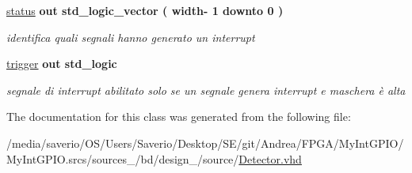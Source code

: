 \begin{DoxyCompactItemize}
\mbox{\label{classDetector_a17089959c3a7d7eef447970d57b5fece}} 
\hyperlink{classDetector_a17089959c3a7d7eef447970d57b5fece}{status}  {\bfseries {\bfseries \textcolor{vhdlchar}{out}\textcolor{vhdlchar}{ }}} {\bfseries \textcolor{vhdlchar}{std\+\_\+logic\+\_\+vector}\textcolor{vhdlchar}{ }\textcolor{vhdlchar}{(}\textcolor{vhdlchar}{ }\textcolor{vhdlchar}{ }\textcolor{vhdlchar}{width}\textcolor{vhdlchar}{-\/}\textcolor{vhdlchar}{ } \textcolor{vhdldigit}{1} \textcolor{vhdlchar}{ }\textcolor{vhdlchar}{downto}\textcolor{vhdlchar}{ } \textcolor{vhdldigit}{0} \textcolor{vhdlchar}{ }\textcolor{vhdlchar}{)}\textcolor{vhdlchar}{ }} 
\begin{DoxyCompactList}\small\item\em identifica quali segnali hanno generato un interrupt \end{DoxyCompactList}\item 
\mbox{\label{classDetector_a26db6e9d5d0a1ca1f7f7b47fcadb064a}} 
\hyperlink{classDetector_a26db6e9d5d0a1ca1f7f7b47fcadb064a}{trigger}  {\bfseries {\bfseries \textcolor{vhdlchar}{out}\textcolor{vhdlchar}{ }}} {\bfseries \textcolor{vhdlchar}{std\+\_\+logic}\textcolor{vhdlchar}{ }} 
\begin{DoxyCompactList}\small\item\em segnale di interrupt abilitato solo se un segnale genera interrupt e maschera è alta \end{DoxyCompactList}\end{DoxyCompactItemize}


The documentation for this class was generated from the following file\+:\begin{DoxyCompactItemize}
\item 
/media/saverio/\+O\+S/\+Users/\+Saverio/\+Desktop/\+S\+E/git/\+Andrea/\+F\+P\+G\+A/\+My\+Int\+G\+P\+I\+O/\+My\+Int\+G\+P\+I\+O.\+srcs/sources\+\_/bd/design\+\_/source/\hyperlink{Detector_8vhd}{Detector.\+vhd}\end{DoxyCompactItemize}
